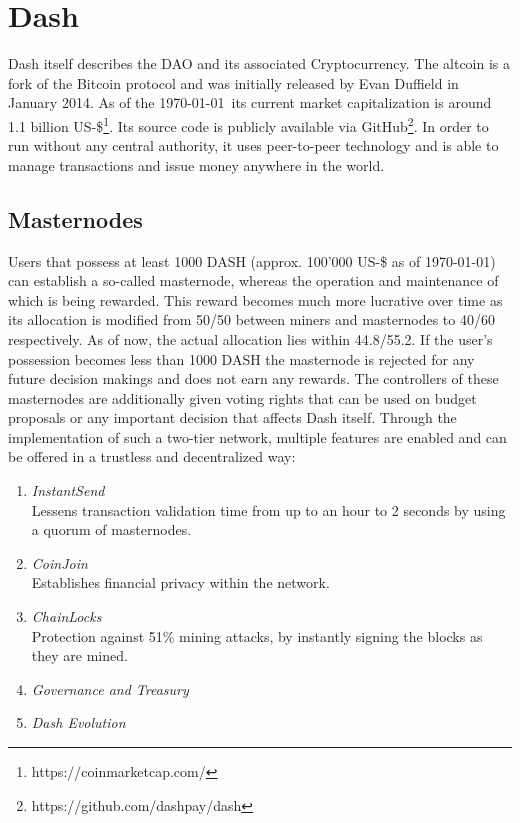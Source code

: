 \documentclass[a4paper,12pt]{report}
\begin{document}
	\section[Dash]{Dash \cite{DashDAODocs}} \label{Dash}
	\startsection
	    Dash itself describes the DAO and its associated Cryptocurrency. The altcoin is a fork of the Bitcoin protocol and was initially released by Evan Duffield in January 2014. As of the \today \ its current market capitalization is around 1.1 billion US-\$\footnote{\hspace{0.5em}https://coinmarketcap.com/}. Its source code is publicly available via GitHub\footnote{\hspace{0.5em}https://github.com/dashpay/dash}. In order to run without any central authority, it uses peer-to-peer technology and is able to manage transactions and issue money anywhere in the world.
	    \subsection{Masternodes} \label{Masternodes}
	    \startsubsection
	        Users that possess at least 1000 DASH (approx. 100'000 US-\$ as of \today) can establish a so-called masternode, whereas the operation and maintenance of which is being rewarded. This reward becomes much more lucrative over time as its allocation is modified from 50/50 between miners and masternodes to 40/60 respectively. As of now, the actual allocation lies within 44.8/55.2. If the user's possession becomes less than 1000 DASH the masternode is rejected for any future decision makings and does not earn any rewards. The controllers of these masternodes are additionally given voting rights that can be used on budget proposals or any important decision that affects Dash itself. Through the implementation of such a two-tier network, multiple features are enabled and can be offered in a trustless and decentralized way:
	        \begin{enumerate}
	            \item \textit{InstantSend} \\
	            Lessens transaction validation time from up to an hour to 2 seconds by using a quorum of masternodes.
	            \item \textit{CoinJoin} \\
	            Establishes financial privacy within the network.
	            \item \textit{ChainLocks} \\
	            Protection against 51\% mining attacks, by instantly signing the blocks as they are mined.
	            \item \textit{Governance and Treasury}
	            \item \textit{Dash Evolution}
	        \end{enumerate}
	    \closesection
\end{document}
